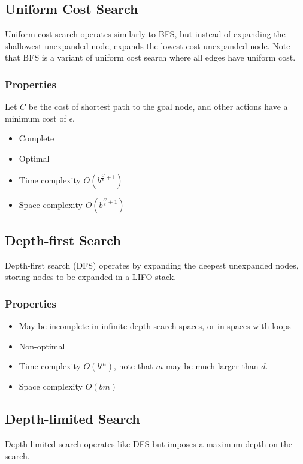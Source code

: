 \documentclass[12pt,titlepage]{article}
\begin{document}
    \subsection{Uniform Cost Search}
      Uniform cost search operates similarly to BFS, but instead of expanding the shallowest unexpanded node, expands the lowest cost
      unexpanded node. Note that BFS is a variant of uniform cost search where all edges have uniform cost.

      \subsubsection{Properties}
        Let $C$ be the cost of shortest path to the goal node, and other actions have a minimum cost of $\epsilon$.
        \begin{itemize}
          \item Complete
          \item Optimal
          \item Time complexity $O(b^{\frac{C}{\epsilon} + 1})$
          \item Space complexity $O(b^{\frac{C}{\epsilon} + 1})$
        \end{itemize}

    \subsection{Depth-first Search}
      Depth-first search (DFS) operates by expanding the deepest unexpanded nodes, storing nodes to be expanded in a LIFO stack.

      \subsubsection{Properties}
        \begin{itemize}
          \item May be incomplete in infinite-depth search spaces, or in spaces with loops
          \item Non-optimal
          \item Time complexity $O(b^m)$, note that $m$ may be much larger than $d$.
          \item Space complexity $O(bm)$
        \end{itemize}

    \subsection{Depth-limited Search}
      Depth-limited search operates like DFS but imposes a maximum depth on the search.
\end{document}
